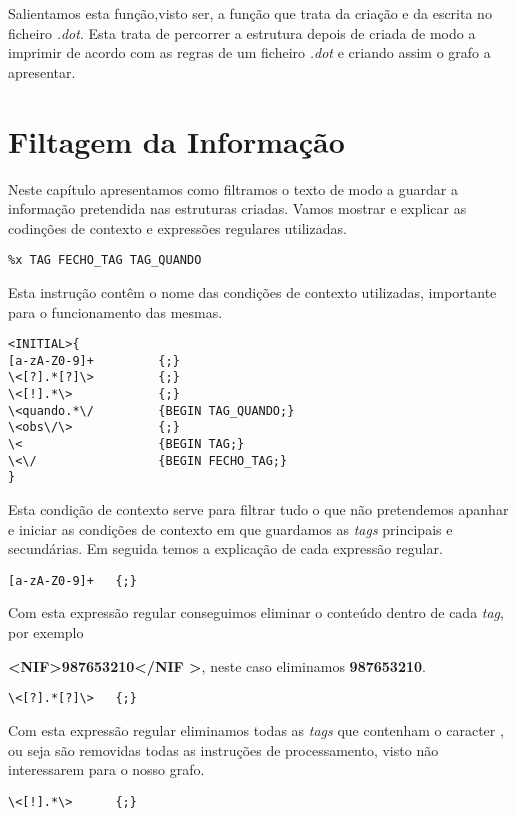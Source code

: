 \documentclass{report}
\def\titulo#1{\section{#1}}
\begin{document}
    Salientamos esta função,visto ser, a função que trata da criação e da escrita no ficheiro \textit{.dot}. Esta trata de percorrer a estrutura depois de criada de modo a imprimir de acordo com as regras de um ficheiro \textit{.dot} e criando assim o grafo a apresentar.

\titulo{Filtagem da Informação}

    Neste capítulo apresentamos como filtramos o texto de modo a guardar a informação pretendida nas estruturas criadas.
    Vamos mostrar e explicar as codinções de contexto e expressões regulares utilizadas.


\bigskip

\begin{verbatim}
%x TAG FECHO_TAG TAG_QUANDO
\end{verbatim}
    
    Esta instrução contêm o nome das condições de contexto utilizadas, importante para o  funcionamento das mesmas. 

\begin{verbatim}
<INITIAL>{
[a-zA-Z0-9]+         {;}
\<[?].*[?]\>         {;}
\<[!].*\>            {;}
\<quando.*\/         {BEGIN TAG_QUANDO;}
\<obs\/\>            {;}
\<                   {BEGIN TAG;}
\<\/                 {BEGIN FECHO_TAG;}
}
\end{verbatim}

    Esta condição de contexto serve para filtrar tudo o que não pretendemos apanhar e iniciar as condições de contexto em que guardamos as \textit{tags} principais e secundárias. Em seguida temos a explicação de cada expressão regular. 

\begin{verbatim}
[a-zA-Z0-9]+   {;}
\end{verbatim}
    
    Com esta expressão regular conseguimos eliminar o conteúdo dentro de cada \textit{tag}, por exemplo 

    \textbf{\textless NIF\textgreater987653210\textless/NIF \textgreater}, neste caso eliminamos \textbf{987653210}.

\begin{verbatim}
\<[?].*[?]\>   {;}
\end{verbatim}

    Com esta expressão regular eliminamos todas as \textit{tags} que contenham o caracter \textbf{\?}, ou seja são removidas todas as instruções de processamento, visto não interessarem para o nosso grafo.

\begin{verbatim}
\<[!].*\>      {;}
\end{verbatim}
\end{document}
